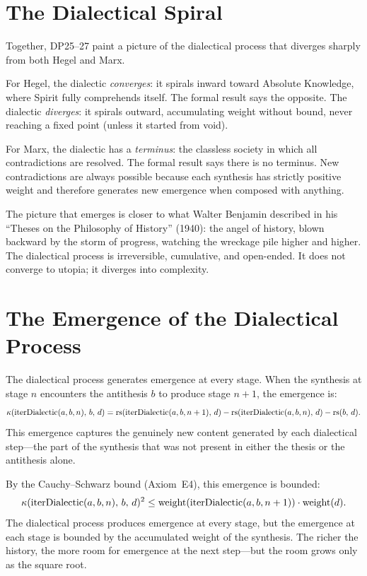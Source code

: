 \section{The Dialectical Spiral}

Together, DP25--27 paint a picture of the dialectical process that
diverges sharply from both Hegel and Marx.

For Hegel, the dialectic \emph{converges}: it spirals inward toward
Absolute Knowledge, where Spirit fully comprehends itself.  The
formal result says the opposite.  The dialectic \emph{diverges}: it
spirals outward, accumulating weight without bound, never reaching a
fixed point (unless it started from void).

For Marx, the dialectic has a \emph{terminus}: the classless society
in which all contradictions are resolved.  The formal result says
there is no terminus.  New contradictions are always possible because
each synthesis has strictly positive weight and therefore generates
new emergence when composed with anything.

The picture that emerges is closer to what Walter Benjamin described
in his ``Theses on the Philosophy of History'' (1940): the angel of
history, blown backward by the storm of progress, watching the
wreckage pile higher and higher.  The dialectical process is
irreversible, cumulative, and open-ended.  It does not converge to
utopia; it diverges into complexity.

\section{The Emergence of the Dialectical Process}

The dialectical process generates emergence at every stage.  When the
synthesis at stage $n$ encounters the antithesis $b$ to produce stage
$n+1$, the emergence is:
\[
\kappa(\mathrm{iterDialectic}(a,b,n),\, b,\, d)
= \mathrm{rs}(\mathrm{iterDialectic}(a,b,n+1),\, d)
- \mathrm{rs}(\mathrm{iterDialectic}(a,b,n),\, d) - \mathrm{rs}(b,\, d).
\]
This emergence captures the genuinely new content generated by each
dialectical step---the part of the synthesis that was not present
in either the thesis or the antithesis alone.

By the Cauchy--Schwarz bound (Axiom~E4), this emergence is bounded:
\[
\kappa(\mathrm{iterDialectic}(a,b,n),\, b,\, d)^2 \leq
\mathrm{weight}(\mathrm{iterDialectic}(a,b,n+1)) \cdot \mathrm{weight}(d).
\]
The dialectical process produces emergence at every stage, but the
emergence at each stage is bounded by the accumulated weight of
the synthesis.  The richer the history, the more room for emergence
at the next step---but the room grows only as the square root.

